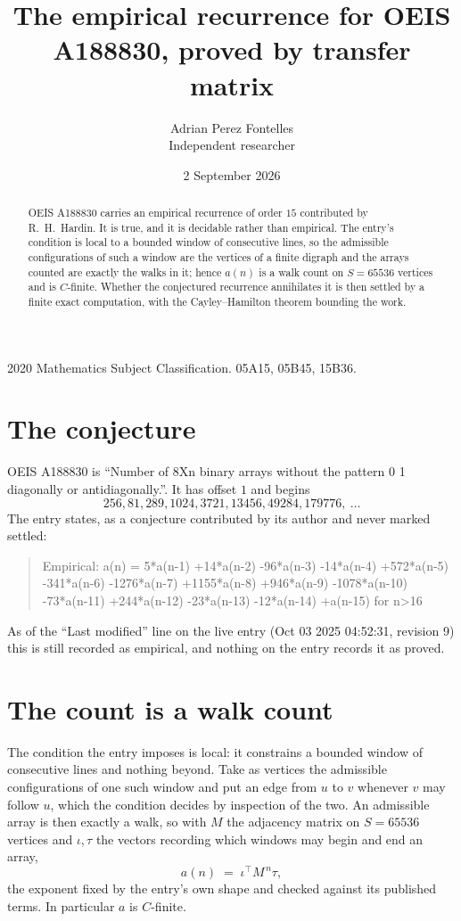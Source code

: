 \documentclass[11pt,a4paper]{article}
\title{The empirical recurrence for OEIS A188830, proved by transfer matrix}
\author{Adrian Perez Fontelles\\ \small Independent researcher}
\date{2 September 2026}
\theoremstyle{plain}
\theoremstyle{definition}
\begin{document}
\maketitle

\begin{abstract}
OEIS A188830 carries an empirical recurrence of order $15$ contributed by R.~H.~Hardin. It is
true, and it is decidable rather than empirical. The entry's condition is local to a bounded window of consecutive lines, so
the admissible configurations of such a window are the vertices of a finite digraph and the
arrays counted are exactly the walks in it; hence $a(n)$ is a walk count on $S=65536$ vertices
and is $C$-finite. Whether the conjectured recurrence annihilates it is then settled by a
finite exact computation, with the Cayley--Hamilton theorem bounding the work.
\end{abstract}

\noindent\small 2020 Mathematics Subject Classification. 05A15, 05B45, 15B36.\normalsize

\section{The conjecture}

OEIS A188830 is ``Number of 8Xn binary arrays without the pattern 0 1 diagonally or antidiagonally.''. It has offset $1$ and begins
\[
256, 81, 289, 1024, 3721, 13456, 49284, 179776,\ \dots
\]
The entry states, as a conjecture contributed by its author and never marked settled:
\begin{quote}
Empirical: a(n) = 5*a(n-1) +14*a(n-2) -96*a(n-3) -14*a(n-4) +572*a(n-5) -341*a(n-6) -1276*a(n-7) +1155*a(n-8) +946*a(n-9) -1078*a(n-10) -73*a(n-11) +244*a(n-12) -23*a(n-13) -12*a(n-14) +a(n-15) for n>16
\end{quote}
As of the ``Last modified'' line on the live entry (Oct 03 2025 04:52:31, revision 9) this is still
recorded as empirical, and nothing on the entry records it as proved.

\section{The count is a walk count}

The condition the entry imposes is local: it constrains a bounded window of consecutive lines and nothing beyond. Take as
vertices the admissible configurations of one such window and put an edge from $u$ to $v$
whenever $v$ may follow $u$, which the condition decides by inspection of the two. An
admissible array is then exactly a walk, so with $M$ the adjacency matrix on $S=65536$ vertices
and $\iota,\tau$ the vectors recording which windows may begin and end an array,
\[
a(n)\;=\;\iota^{\!\top}M^{\,n}\tau ,
\]
the exponent fixed by the entry's own shape and checked against its published terms. In
particular $a$ is $C$-finite.
\end{document}
